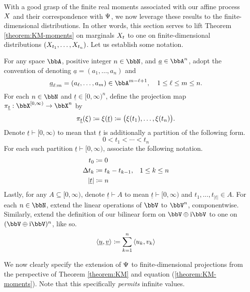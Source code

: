 With a good grasp of the finite real moments associated with our affine process $X$ and their correspondence with $\Psi$, we now leverage these results to the finite-dimensional distributions.
In other words, this section serves to lift Theorem \ref{theorem:KM-moments} on marginals $X_t$ to one on finite-dimensional distributions $(X_{t_1}, \ldots, X_{t_n})$.
Let us establish some notation.

For any space $\bbA$, positive integer $n\in\bbN$, and $\underline a \in \bbA^n$, adopt the convention of denoting $\underline a = (a_1, \ldots, a_n)$ and 
\begin{equation*}
  \underline a_{\ell:m} = (a_\ell,\ldots,a_m) \in \bbA^{m-\ell+1}, \quad 1 \leq \ell \leq m \leq n.
\end{equation*}
For each $n\in \bbN$ and $\underline t \in [0,\infty)^n$, define the projection map $\pi_{\underline t}: \stateSpace^{[0,\infty)} \rightarrow \stateSpace^n$ by
\begin{equation*}
  \pi_{\underline t}(\xi) \coloneqq \xi(\underline t) \coloneqq \big( \xi(t_1), \ldots, \xi(t_n) \big).
\end{equation*}
Denote $\underline t \vdash [0,\infty)$ to mean that $\underline t$ is additionally a partition of the following form.
\begin{equation*}
  0 < t_1 < \cdots < t_n
\end{equation*}
For each such partition $\underline t \vdash [0,\infty)$, associate the following notation.
\begin{align*}
  t_0 &\coloneqq 0 \\
  \Delta t_k &\coloneqq t_k - t_{k-1}, & 1 \leq k \leq n \\
  |\underline t| &\coloneqq n
\end{align*}
Lastly, for any $A \subseteq [0,\infty)$, denote $\underline t \vdash A$ to mean $\underline t \vdash [0,\infty)$ and $t_1,\ldots,t_{|\underline t|} \in A$.
For each $n \in \bbN$, extend the linear operations of $\vecSpace$ to $\vecSpace^n$, componentwise.
Similarly, extend the definition of our bilinear form on $\vecSpace \oplus \im\vecSpace$ to one on $(\vecSpace \oplus \im\vecSpace)^n$, like so.
\begin{equation*}
  {\langle \underline{u}, \underline{v}\rangle} \coloneqq \sum_{k=1}^n {\langle u_k , v_k \rangle}
\end{equation*}

We now clearly specify the extension of $\Psi$ to finite-dimensional projections from the perspective of Theorem \ref{theorem:KM} and equation (\ref{theorem:KM-moments}).
Note that this specifically \emph{permits} infinite values.

